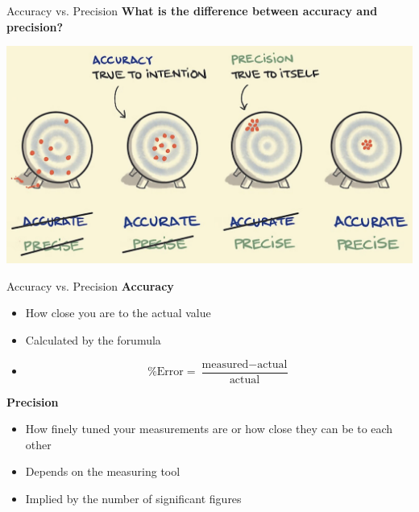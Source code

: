 \documentclass[11pt]{beamer}
\begin{document}
\begin{frame}{}
\end{frame}

\begin{frame}{}
\end{frame}

\begin{frame}{Accuracy vs. Precision}
  \textbf{What is the difference between accuracy
    and precision?}

  \centering
  \includegraphics[scale=0.15]{accur_prec.png}
\end{frame}

\begin{frame}{Accuracy vs. Precision}
  \textbf{Accuracy}
  \begin{itemize}
  \item How close you are to the actual value
  \item Calculated by the forumula
  \item[] \begin{equation}
    \% \text{Error} = \frac{\text{measured} - \text{actual}}{\text{actual}}
  \end{equation}
  \end{itemize}
  
  \textbf{Precision}
  \begin{itemize}
  \item How finely tuned your measurements are or
    how close they can be to each other
  \item Depends on the measuring tool
  \item Implied by the number of significant figures
  \end{itemize}
\end{frame}
\end{document}
